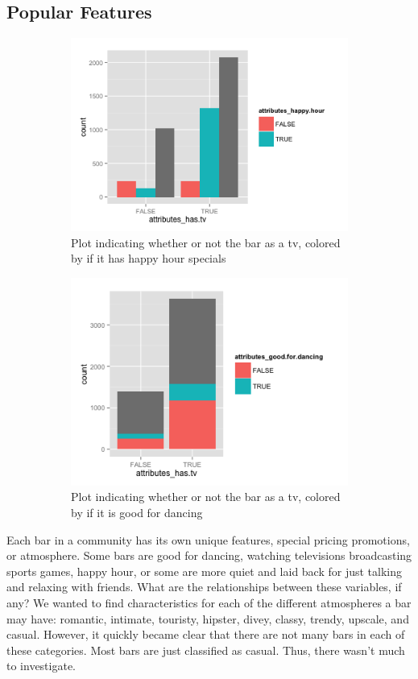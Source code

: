 \documentclass[11pt]{article}
\begin{document}
\subsection{Popular Features}
\begin{figure}
\centering
\begin{subfigure}{.5\textwidth}
  \centering
  \includegraphics[width=0.75\linewidth]{Figures/tvhappyhour.png}
  \caption{Plot indicating whether or not the bar as a tv, colored by if it has happy hour specials}
  \label{happy}
\end{subfigure}%
\begin{subfigure}{.5\textwidth}
  \centering
  \includegraphics[width=0.75\linewidth]{Figures/tvdancing.png}
  \caption{Plot indicating whether or not the bar as a tv, colored by if it is good for dancing}
  \label{dance}
\end{subfigure}
\caption{}
\label{}
\end{figure}

\vspace{5mm}
Each bar in a community has its own unique features, special pricing promotions, or atmosphere.  Some bars are good for dancing, watching televisions broadcasting sports games, happy hour, or some are more quiet and laid back for just talking and relaxing with friends.  What are the relationships between these variables, if any?  We wanted to find characteristics for each of the  different atmospheres a bar may have: romantic, intimate, touristy, hipster, divey, classy, trendy, upscale, and casual.  However, it quickly became clear that there are not many bars in each of these categories.  Most bars are just classified as casual.  Thus, there wasn't much to investigate.
\end{document}
